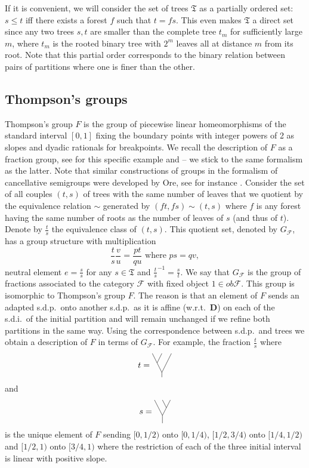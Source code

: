 \documentclass[a4paper,12pt]{amsart}
\numberwithin{equation}{section}
\theoremstyle{definition}
\newcommand{\D}{\mathbf D}
\newcommand{\cF}{\mathcal F}
\newcommand{\fT}{\mathfrak T}
\begin{document}
If it is convenient, we will consider the set of trees $\fT$ as a partially ordered set: $s\leq t$ iff there exists a forest $f$ such that $t=fs$.
This even makes $\fT$ a direct set since any two trees $s,t$ are smaller than the complete tree $t_m$ for sufficiently large $m$, where $t_m$ is the rooted binary tree with $2^m$ leaves all at distance $m$ from its root.
Note that this partial order corresponds to the binary relation between pairs of partitions where one is finer than the other.

\subsection{Thompson's groups}
Thompson's group $F$ is the group of piecewise linear homeomorphisms of the standard interval $[0,1]$ fixing the boundary points with integer powers of 2 as slopes and dyadic rationals for breakpoints.
We recall the description of $F$ as a fraction group, see \cite{Cannon-Floyd-Parry96} for this specific example and \cite{Belk04, Jones16-Thompson} -- we stick to the same formalism as the latter.
Note that similar constructions of groups in the formalism of cancellative semigroups were developed by Ore, see for instance \cite{Maltsev53}.
Consider the set of all couples $(t,s)$ of trees with the same number of leaves that we quotient by the equivalence relation $\sim$ generated by $(ft,fs)\sim (t,s)$ where $f$ is any forest having the same number of roots as the number of leaves of $s$ (and thus of $t$).
Denote by $\tfrac{t}{s}$ the equivalence class of $(t,s)$.
This quotient set, denoted by $G_\cF$, has a group structure with multiplication
$$\dfrac{t}{s} \dfrac{v}{u} = \dfrac{pt}{qu} \text{ where } ps = qv,$$
neutral element $e=\tfrac{s}{s}$ for any $s\in\fT$ and $\tfrac{t}{s}^{-1} = \tfrac{s}{t}.$
We say that $G_\cF$ is the group of fractions associated to the category $\cF$ with fixed object $1\in ob\cF.$
This group is isomorphic to Thompson's group $F$.
The reason is that an element of $F$ sends an adapted s.d.p.~onto another s.d.p.~as it is affine (w.r.t.~$\D$) on each of the s.d.i.~of the initial partition and will remain unchanged if we refine both partitions in the same way. 
Using the correspondence between s.d.p.~and trees we obtain a description of $F$ in terms of $G_\cF$.
\newcommand{\funfdeux}{
\begin{tikzpicture}[baseline = .4cm]
\draw (2,0)--(2,1/3);
\draw (2,1/3)--(5/3,1);
\draw (2,1/3)--(7/3,1);
\draw (13/6,2/3)--(2,1);
\end{tikzpicture}
}
%
{For example, the fraction $\tfrac{t}{s}$ where 
$$t=\funfun$$ and $$s=\funfdeux$$ is the unique element of $F$ sending $[0,1/2)$ onto $[0,1/4)$, $[1/2,3/4)$ onto $[1/4,1/2)$ and $[1/2,1)$ onto $[3/4,1)$ where the restriction of each of the three initial interval is linear with positive slope.}
\end{document}
